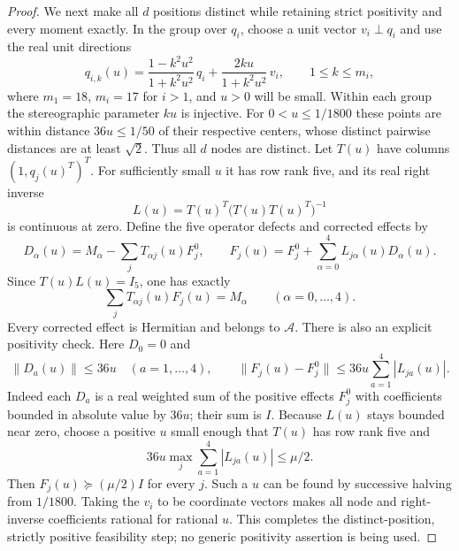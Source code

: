 \documentclass[12pt,a4paper]{article}
\begin{document}
\begin{proof}
We next make all $d$ positions distinct while retaining strict positivity
and every moment exactly. In the group over $q_i$, choose a unit vector
$v_i\perp q_i$ and use the real unit directions
\[
 q_{i,k}(u)=
 \frac{1-k^2u^2}{1+k^2u^2}\,q_i+
 \frac{2ku}{1+k^2u^2}\,v_i,
 \qquad 1\le k\le m_i,
\]
where $m_1=18$, $m_i=17$ for $i>1$, and $u>0$ will be small.
Within each group the stereographic parameter $ku$ is injective.
For $0<u\le1/1800$ these points are within distance $36u\le1/50$
of their respective centers, whose distinct pairwise distances are at
least $\sqrt2$. Thus all $d$ nodes are distinct. Let $T(u)$ have columns
$(1,q_j(u)^T)^T$. For sufficiently small $u$ it has row rank five, and
its real right inverse
\[
 L(u)=T(u)^T\bigl(T(u)T(u)^T\bigr)^{-1}
\]
is continuous at zero. Define the five operator defects and corrected
effects by
\[
 D_\alpha(u)=M_\alpha-\sum_jT_{\alpha j}(u)F_j^0,
 \qquad
 F_j(u)=F_j^0+\sum_{\alpha=0}^4L_{j\alpha}(u)D_\alpha(u).
\]
Since $T(u)L(u)=I_5$, one has exactly
\begin{equation}
 \sum_jT_{\alpha j}(u)F_j(u)=M_\alpha
 \qquad(\alpha=0,\ldots,4).
 \label{p2c:eq:v258-moment-correction}
\end{equation}
Every corrected effect is Hermitian and belongs to $\mathcal A$.
There is also an explicit positivity check. Here $D_0=0$ and
\[
 \|D_a(u)\|\le36u\quad(a=1,\ldots,4),\qquad
 \|F_j(u)-F_j^0\|
 \le36u\sum_{a=1}^4|L_{ja}(u)|.
\]
Indeed each $D_a$ is a real weighted sum of the positive effects $F_j^0$
with coefficients bounded in absolute value by $36u$; their sum is $I$.
Because $L(u)$ stays bounded near zero, choose a positive $u$ small
enough that $T(u)$ has row rank five and
\[
 36u\max_j\sum_{a=1}^4|L_{ja}(u)|\le\mu/2.
\]
Then $F_j(u)\succeq(\mu/2)I$ for every $j$. Such a $u$ can be found by
successive halving from $1/1800$. Taking the $v_i$ to be coordinate
vectors makes all node and right-inverse coefficients rational for
rational $u$. This completes the distinct-position, strictly positive
feasibility step; no generic positivity assertion is being used.


\end{proof}
\end{document}
